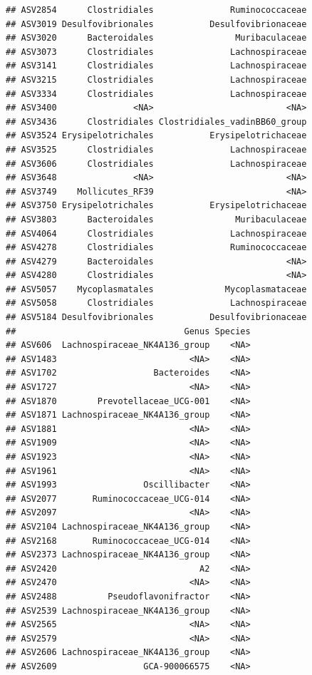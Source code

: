 \documentclass[]{article}
\begin{document}
\begin{verbatim}
## ASV2854      Clostridiales               Ruminococcaceae
## ASV3019 Desulfovibrionales           Desulfovibrionaceae
## ASV3020      Bacteroidales                Muribaculaceae
## ASV3073      Clostridiales               Lachnospiraceae
## ASV3141      Clostridiales               Lachnospiraceae
## ASV3215      Clostridiales               Lachnospiraceae
## ASV3334      Clostridiales               Lachnospiraceae
## ASV3400               <NA>                          <NA>
## ASV3436      Clostridiales Clostridiales_vadinBB60_group
## ASV3524 Erysipelotrichales           Erysipelotrichaceae
## ASV3525      Clostridiales               Lachnospiraceae
## ASV3606      Clostridiales               Lachnospiraceae
## ASV3648               <NA>                          <NA>
## ASV3749    Mollicutes_RF39                          <NA>
## ASV3750 Erysipelotrichales           Erysipelotrichaceae
## ASV3803      Bacteroidales                Muribaculaceae
## ASV4064      Clostridiales               Lachnospiraceae
## ASV4278      Clostridiales               Ruminococcaceae
## ASV4279      Bacteroidales                          <NA>
## ASV4280      Clostridiales                          <NA>
## ASV5057    Mycoplasmatales              Mycoplasmataceae
## ASV5058      Clostridiales               Lachnospiraceae
## ASV5184 Desulfovibrionales           Desulfovibrionaceae
##                                 Genus Species
## ASV606  Lachnospiraceae_NK4A136_group    <NA>
## ASV1483                          <NA>    <NA>
## ASV1702                   Bacteroides    <NA>
## ASV1727                          <NA>    <NA>
## ASV1870        Prevotellaceae_UCG-001    <NA>
## ASV1871 Lachnospiraceae_NK4A136_group    <NA>
## ASV1881                          <NA>    <NA>
## ASV1909                          <NA>    <NA>
## ASV1923                          <NA>    <NA>
## ASV1961                          <NA>    <NA>
## ASV1993                 Oscillibacter    <NA>
## ASV2077       Ruminococcaceae_UCG-014    <NA>
## ASV2097                          <NA>    <NA>
## ASV2104 Lachnospiraceae_NK4A136_group    <NA>
## ASV2168       Ruminococcaceae_UCG-014    <NA>
## ASV2373 Lachnospiraceae_NK4A136_group    <NA>
## ASV2420                            A2    <NA>
## ASV2470                          <NA>    <NA>
## ASV2488          Pseudoflavonifractor    <NA>
## ASV2539 Lachnospiraceae_NK4A136_group    <NA>
## ASV2565                          <NA>    <NA>
## ASV2579                          <NA>    <NA>
## ASV2606 Lachnospiraceae_NK4A136_group    <NA>
## ASV2609                 GCA-900066575    <NA>

\end{verbatim}
\end{document}
